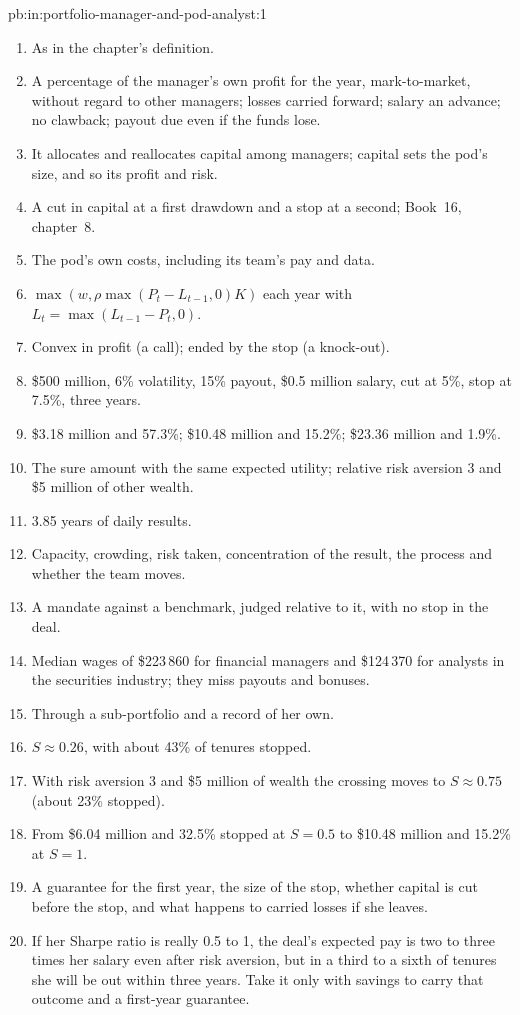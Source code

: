 \begin{solution}{pb:in:portfolio-manager-and-pod-analyst:1}
\begin{enumerate}
\item As in the chapter's definition.
\item A percentage of the manager's own profit for the year, mark-to-market, without regard to other managers; losses
carried forward; salary an advance; no clawback; payout due even if the funds lose.
\item It allocates and reallocates capital among managers; capital sets the pod's size, and so its profit and risk.
\item A cut in capital at a first drawdown and a stop at a second; Book~16, chapter~8.
\item The pod's own costs, including its team's pay and data.
\item $\max(w,\rho\max(P_t-L_{t-1},0)K)$ each year with $L_t=\max(L_{t-1}-P_t,0)$.
\item Convex in profit (a call); ended by the stop (a knock-out).
\item \$500 million, 6\% volatility, 15\% payout, \$0.5 million salary, cut at 5\%, stop at 7.5\%, three years.
\item \$3.18 million and 57.3\%; \$10.48 million and 15.2\%; \$23.36 million and 1.9\%.
\item The sure amount with the same expected utility; relative risk aversion 3 and \$5 million of other wealth.
\item 3.85 years of daily results.
\item Capacity, crowding, risk taken, concentration of the result, the process and whether the team moves.
\item A mandate against a benchmark, judged relative to it, with no stop in the deal.
\item Median wages of \$223\,860 for financial managers and \$124\,370 for analysts in the securities industry; they miss
payouts and bonuses.
\item Through a sub-portfolio and a record of her own.
\item $S\approx0.26$, with about 43\% of tenures stopped.
\item With risk aversion 3 and \$5 million of wealth the crossing moves to $S\approx0.75$ (about 23\% stopped).
\item From \$6.04 million and 32.5\% stopped at $S=0.5$ to \$10.48 million and 15.2\% at $S=1$.
\item A guarantee for the first year, the size of the stop, whether capital is cut before the stop, and what happens to
carried losses if she leaves.
\item If her Sharpe ratio is really 0.5 to 1, the deal's expected pay is two to three times her salary even after risk
aversion, but in a third to a sixth of tenures she will be out within three years. Take it only with savings to carry
that outcome and a first-year guarantee.
\end{enumerate}
\end{solution}

